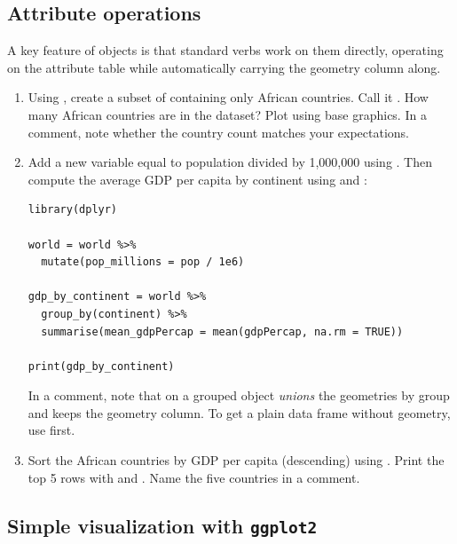 \subsection{Attribute operations}

A key feature of  objects is that standard  verbs work on them directly, operating on the attribute table while automatically carrying the geometry column along.

\begin{enumerate}[label=\alph*)]
  \item Using , create a subset of  containing only African countries. Call it . How many African countries are in the dataset? Plot  using base graphics. In a comment, note whether the country count matches your expectations.

  \item Add a new variable  equal to population divided by 1{,}000{,}000 using . Then compute the average GDP per capita by continent using  and :
  \begin{lstlisting}
library(dplyr)

world = world %>%
  mutate(pop_millions = pop / 1e6)

gdp_by_continent = world %>%
  group_by(continent) %>%
  summarise(mean_gdpPercap = mean(gdpPercap, na.rm = TRUE))

print(gdp_by_continent)
  \end{lstlisting}
  In a comment, note that  on a grouped  object \textit{unions} the geometries by group and keeps the geometry column. To get a plain data frame without geometry, use  first.

  \item Sort the African countries by GDP per capita (descending) using . Print the top 5 rows with  and . Name the five countries in a comment.
\end{enumerate}

\subsection{Simple visualization with \texttt{ggplot2}}

